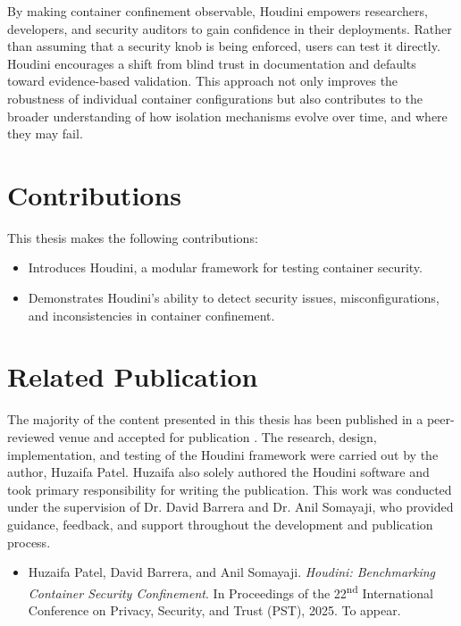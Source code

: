 \documentclass[12pt]{report}
\begin{document}
\begin{doublespace}
By making container confinement observable, Houdini empowers researchers, developers, and security auditors to gain confidence in their deployments. Rather than assuming that a security knob is being enforced, users can test it directly. Houdini encourages a shift from blind trust in documentation and defaults toward evidence-based validation. This approach not only improves the robustness of individual container configurations but also contributes to the broader understanding of how isolation mechanisms evolve over time, and where they may fail.



\section{Contributions}

This thesis makes the following contributions:
\begin{itemize}
    \item Introduces Houdini, a modular framework for testing container security.
    \item Demonstrates Houdini’s ability to detect security issues, misconfigurations, and inconsistencies in container confinement.
\end{itemize}

\section{Related Publication}

The majority of the content presented in this thesis has been published in a peer-reviewed venue and accepted for publication \cite{houdini}. The research, design, implementation, and testing of the Houdini framework were carried out by the author, Huzaifa Patel. Huzaifa also solely authored the Houdini software and took primary responsibility for writing the publication. This work was conducted under the supervision of Dr. David Barrera and Dr. Anil Somayaji, who provided guidance, feedback, and support throughout the development and publication process.

\begin{itemize}
    \item Huzaifa Patel, David Barrera, and Anil Somayaji. \textit{Houdini: Benchmarking Container Security Confinement}. In Proceedings of the 22\textsuperscript{nd} International Conference on Privacy, Security, and Trust (PST), 2025. To appear.
\end{itemize}



\end{doublespace}
\end{document}
